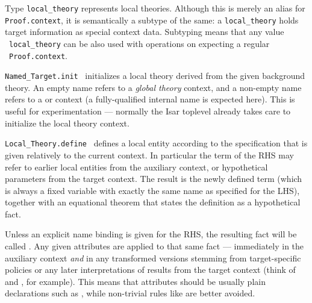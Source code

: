 \begin{isabellebody}
\begin{isamarkuptext}
  \begin{description}

  \item Type \verb|local_theory| represents local theories.
  Although this is merely an alias for \verb|Proof.context|, it is
  semantically a subtype of the same: a \verb|local_theory| holds
  target information as special context data.  Subtyping means that
  any value ~\verb|local_theory| can be also used
  with operations on expecting a regular ~\verb|Proof.context|.

  \item \verb|Named_Target.init|~ initializes a local
  theory derived from the given background theory.  An empty name
  refers to a \emph{global theory} context, and a non-empty name
  refers to a \hyperlink{command.locale}{\mbox{}} or \hyperlink{command.class}{\mbox{}} context (a
  fully-qualified internal name is expected here).  This is useful for
  experimentation --- normally the Isar toplevel already takes care to
  initialize the local theory context.

  \item \verb|Local_Theory.define|~ defines a local entity according to the specification that is
  given relatively to the current  context.  In
  particular the term of the RHS may refer to earlier local entities
  from the auxiliary context, or hypothetical parameters from the
  target context.  The result is the newly defined term (which is
  always a fixed variable with exactly the same name as specified for
  the LHS), together with an equational theorem that states the
  definition as a hypothetical fact.

  Unless an explicit name binding is given for the RHS, the resulting
  fact will be called .  Any given attributes are
  applied to that same fact --- immediately in the auxiliary context
  \emph{and} in any transformed versions stemming from target-specific
  policies or any later interpretations of results from the target
  context (think of \hyperlink{command.locale}{\mbox{}} and \hyperlink{command.interpretation}{\mbox{}},
  for example).  This means that attributes should be usually plain
  declarations such as \hyperlink{attribute.simp}{\mbox{}}, while non-trivial rules like
  \hyperlink{attribute.simplified}{\mbox{}} are better avoided.


\end{description}
\end{isamarkuptext}
\end{isabellebody}
